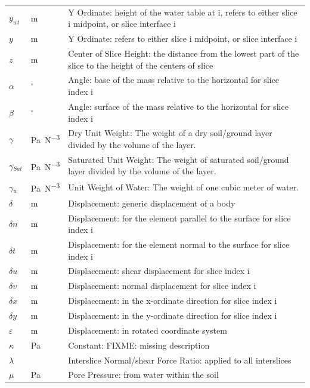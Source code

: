 \documentclass[12pt]{article}
\begin{document}
\begin{longtable}{  l  l  p{8.5cm}  }
\\
${y_{wt}}$ &  \si{\meter}&Y Ordinate: height of the water table at i, refers to either slice i midpoint, or slice interface i 
\\
$y$ &  \si{\meter}&Y Ordinate: refers to either slice i midpoint, or slice interface i 
\\
$z$ & \si{\meter}& Center of Slice Height: the distance from the lowest part of the slice to the height of the centers of slice
\\
$\alpha{}$ & ${}^{\circ}$ &Angle: base of the mass relative to the horizontal for slice index i
\\
$\beta{}$ &${}^{\circ}$ & Angle: surface of the mass relative to the horizontal for slice index i
\\
$\gamma{}$ & \si{\pascal\per\cubic\newton} &Dry Unit Weight: The weight of a dry soil/ground layer divided by the volume of the layer.
\\
${\gamma{}_{Sat}}$ &  \si{\pascal\per\cubic\newton} &Saturated Unit Weight: The weight of saturated soil/ground layer divided by the volume of the layer.
\\
${\gamma{}_{w}}$ & \si{\pascal\per\cubic\newton} & Unit Weight of Water: The weight of one cubic meter of water.
\\
$\delta{}$ & \si{\meter}& Displacement: generic displacement of a body 
\\
$\delta{}n$ & \si{\meter}& Displacement: for the element parallel to the surface for slice index i
\\
$\delta{}t$ &  \si{\meter}&Displacement: for the element normal to the surface for slice index i 
\\
$\delta{}u$ &  \si{\meter}&Displacement: shear displacement for slice index i 
\\
$\delta{}v$ & \si{\meter}& Displacement: normal displacement for slice index i 
\\
$\delta{}x$ &  \si{\meter}& Displacement: in the x-ordinate direction for slice index i 
\\
$\delta{}y$ &  \si{\meter}& Displacement: in the y-ordinate direction for slice index i 
\\
$\varepsilon{}$ & \si{\meter}& Displacement: in rotated coordinate system
\\
$\kappa{}$ &\si{\pascal} & Constant: FIXME: missing description
\\
$\lambda{}$ & & Interslice Normal/shear Force Ratio: applied to all interslices
\\
$\mu{}$ &\si{\pascal} & Pore Pressure: from water within the soil

\end{longtable}
\end{document}
